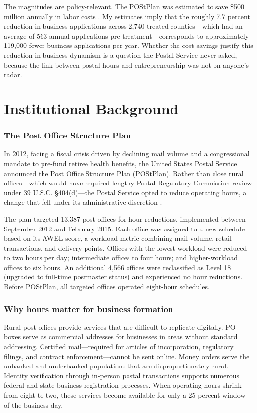 \documentclass[12pt]{article}
\begin{document}
The magnitudes are policy-relevant. The POStPlan was estimated to save \$500 million annually in labor costs \citep{gao2016postal}. My estimates imply that the roughly 7.7 percent reduction in business applications across 2,740 treated counties---which had an average of 563 annual applications pre-treatment---corresponds to approximately 119,000 fewer business applications per year. Whether the cost savings justify this reduction in business dynamism is a question the Postal Service never asked, because the link between postal hours and entrepreneurship was not on anyone's radar.

\section{Institutional Background}

\subsubsection*{The Post Office Structure Plan} In 2012, facing a fiscal crisis driven by declining mail volume and a congressional mandate to pre-fund retiree health benefits, the United States Postal Service announced the Post Office Structure Plan (POStPlan). Rather than close rural offices---which would have required lengthy Postal Regulatory Commission review under 39 U.S.C. \S 404(d)---the Postal Service opted to reduce operating hours, a change that fell under its administrative discretion \citep{gao2016postal}.

The plan targeted 13,387 post offices for hour reductions, implemented between September 2012 and February 2015. Each office was assigned to a new schedule based on its AWEL score, a workload metric combining mail volume, retail transactions, and delivery points. Offices with the lowest workload were reduced to two hours per day; intermediate offices to four hours; and higher-workload offices to six hours. An additional 4,566 offices were reclassified as Level 18 (upgraded to full-time postmaster status) and experienced no hour reductions. Before POStPlan, all targeted offices operated eight-hour schedules.

\subsubsection*{Why hours matter for business formation} Rural post offices provide services that are difficult to replicate digitally. PO boxes serve as commercial addresses for businesses in areas without standard addressing. Certified mail---required for articles of incorporation, regulatory filings, and contract enforcement---cannot be sent online. Money orders serve the unbanked and underbanked populations that are disproportionately rural. Identity verification through in-person postal transactions supports numerous federal and state business registration processes. When operating hours shrink from eight to two, these services become available for only a 25 percent window of the business day.
\end{document}
